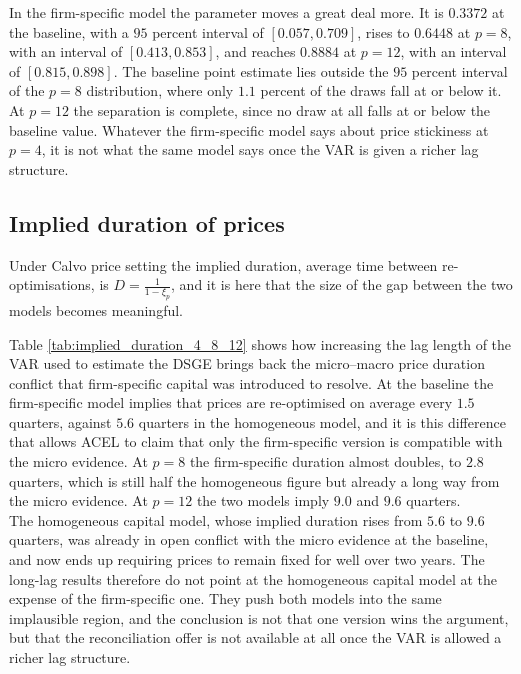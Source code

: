 \documentclass[12pt, a4paper]{article}
\begin{document}
In the firm-specific model the parameter moves a great deal more. It is $0.3372$ at the
baseline, with a $95$ percent interval of $[0.057, 0.709]$, rises to $0.6448$ at $p = 8$, with
an interval of $[0.413, 0.853]$, and reaches $0.8884$ at $p = 12$, with an interval of
$[0.815, 0.898]$. The baseline point estimate lies outside the $95$ percent interval of the
$p = 8$ distribution, where only $1.1$ percent of the draws fall at or below it. At $p = 12$ the
separation is complete, since no draw at all falls at or below the baseline value. Whatever the
firm-specific model says about price stickiness at $p = 4$, it is not what the same model says
once the VAR is given a richer lag structure.

\subsection{Implied duration of prices}
\label{sec:results_duration}

Under Calvo price setting the implied duration, average time between re-optimisations, is
$D = \frac{1}{1-\xi_p}$, and it is here that the size of the gap between the two models becomes
meaningful.

    {}
    {\noindent{}}
\FloatBarrier

Table \ref{tab:implied_duration_4_8_12} shows how increasing the lag length of the VAR used to
estimate the \citet{ACEL2011} DSGE brings back the micro--macro price duration conflict that
firm-specific capital was introduced to resolve. At the baseline the firm-specific model implies
that prices are re-optimised on average every $1.5$ quarters, against $5.6$ quarters in the
homogeneous model, and it is this difference that allows ACEL to claim that only the
firm-specific version is compatible with the micro evidence. At $p = 8$ the firm-specific
duration almost doubles, to $2.8$ quarters, which is still half the homogeneous figure but
already a long way from the micro evidence. At $p = 12$ the two models imply $9.0$ and $9.6$
quarters.
\\

The homogeneous capital model, whose implied duration rises from $5.6$ to $9.6$ quarters, 
was already in open conflict with the micro evidence at the baseline, and now
ends up requiring prices to remain fixed for well over two years. The long-lag results therefore
do not point at the homogeneous capital model at the expense of the firm-specific one. They
push both models into the same implausible region, and the conclusion is not that one version
wins the argument, but that the reconciliation \citet{ACEL2011} offer is not available at all
once the VAR is allowed a richer lag structure.
\\
\end{document}
